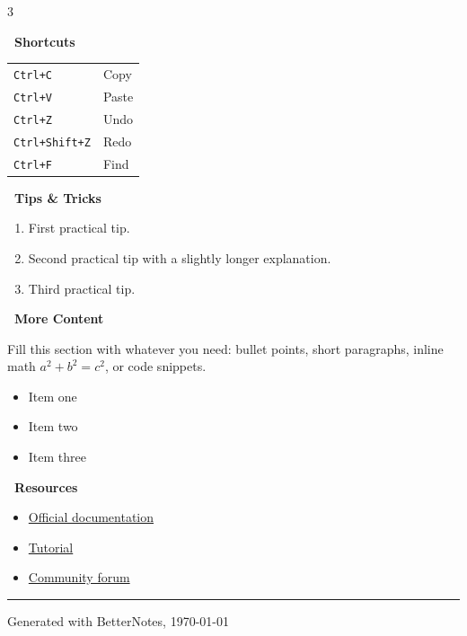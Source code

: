 \documentclass[8pt,landscape,a4paper]{extarticle}
\newcommand{\cheatsection}[1]{%
  \vspace{6pt}%
  \noindent\colorbox{headerblue}{%
    \parbox[c][1.05em][c]{\dimexpr\linewidth-2\fboxsep\relax}{%
      \color{white}\bfseries\ #1%
    }%
  }\par\vspace{3pt}%
}
\newcommand{\kbd}[1]{\colorbox{boxgray}{\texttt{\small #1}}}
\begin{document}
\begin{multicols}{3}
\cheatsection{Shortcuts}
\begin{tabular}{@{}ll@{}}
\kbd{Ctrl+C}        & Copy \\
\kbd{Ctrl+V}        & Paste \\
\kbd{Ctrl+Z}        & Undo \\
\kbd{Ctrl+Shift+Z}  & Redo \\
\kbd{Ctrl+F}        & Find \\
\end{tabular}

\cheatsection{Tips \& Tricks}
\begin{enumerate}
  \item First practical tip.
  \item Second practical tip with a slightly longer explanation.
  \item Third practical tip.
\end{enumerate}

\cheatsection{More Content}
Fill this section with whatever you need: bullet points, short
paragraphs, inline math $a^2 + b^2 = c^2$, or code snippets.

\begin{itemize}
  \item Item one
  \item Item two
  \item Item three
\end{itemize}

\cheatsection{Resources}
\begin{itemize}
  \item \href{https://example.com}{Official documentation}
  \item \href{https://example.com}{Tutorial}
  \item \href{https://example.com}{Community forum}
\end{itemize}

\end{multicols}

\vfill
{\footnotesize\color{rulegray}\hrule}
\smallskip
{\tiny Generated with BetterNotes, \today\  }
\end{document}
